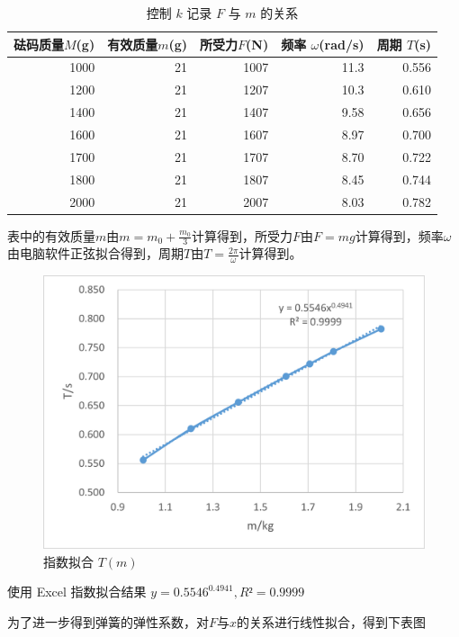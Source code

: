 \documentclass[a4paper,zihao=5,UTF8,fontset=fandol]{../phyreport}
\begin{document}
\begin{table}[H]
	\centering
	\caption{控制 $k$ 记录 $F$ 与 $m$ 的关系}
	  \begin{tabular}{rrrrr}
		\toprule
		砝码质量$M$(g) & 有效质量$m$(g) & 所受力$F$(N) & 频率 $\omega $(rad/s)& 周期 $T$(s) \\
		\midrule
	  1000  & 21    & 1007  & 11.3  & 0.556  \\
	  1200  & 21    & 1207  & 10.3  & 0.610  \\
	  1400  & 21    & 1407  & 9.58  & 0.656  \\
	  1600  & 21    & 1607  & 8.97  & 0.700  \\
	  1700  & 21    & 1707  & 8.70  & 0.722  \\
	  1800  & 21    & 1807  & 8.45  & 0.744  \\
	  2000  & 21    & 2007  & 8.03  & 0.782  \\
	  \bottomrule
	  \end{tabular}%
	\label{tab:实验一2}%
  \end{table}%
表中的有效质量$m$由$m = m_0 + \frac{m_0}{3}$计算得到，所受力$F$由$F = m g$计算得到，频率$\omega$由电脑软件正弦拟合得到，周期$T$由$T = \frac{2\pi}{\omega}$计算得到。  
\begin{figure}[H]
	\centering
	\includegraphics[width=.5\linewidth]{./fig/实验1指数.png}
	\caption{指数拟合 $T(m)$}\label{fig:实验1指数}
\end{figure}
使用 Excel 指数拟合结果 $y = 0.5546^{0.4941},R² = 0.9999$

为了进一步得到弹簧的弹性系数，对$F$与$x$的关系进行线性拟合，得到下表图
\end{document}
